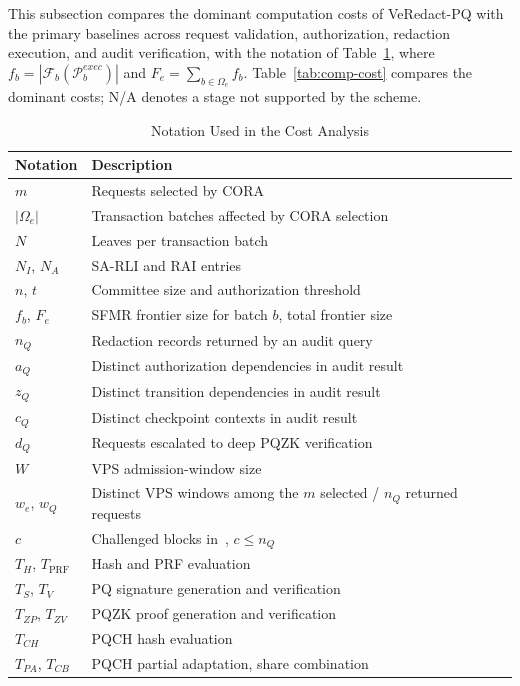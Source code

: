 \documentclass[lettersize,journal]{IEEEtran}
\begin{document}
This subsection compares the dominant computation costs of VeRedact-PQ
with the primary baselines across request validation, authorization,
redaction execution, and audit verification, with the notation of
Table~\ref{tab:cost-notation}, where
$f_b=|\mathcal{F}_b(\mathcal{P}_b^{exec})|$ and
$F_e=\sum_{b\in\Omega_e}f_b$. Table~\ref{tab:comp-cost} compares the
dominant costs; N/A denotes a stage not supported by the scheme.

\begin{table}[t]
\centering
\caption{Notation Used in the Cost Analysis}
\label{tab:cost-notation}
\scriptsize
\renewcommand{\arraystretch}{1.08}
\setlength{\tabcolsep}{3pt}
\begin{tabular}{ll}
\hline
\textbf{Notation} & \textbf{Description} \\
\hline
$m$ & Requests selected by CORA \\
$|\Omega_e|$ & Transaction batches affected by CORA selection \\
$N$ & Leaves per transaction batch \\
$N_I$, $N_A$ & SA-RLI and RAI entries \\
$n$, $t$ & Committee size and authorization threshold \\
$f_b$, $F_e$ & SFMR frontier size for batch $b$, total frontier size \\
$n_Q$ & Redaction records returned by an audit query \\
$a_Q$ & Distinct authorization dependencies in audit result \\
$z_Q$ & Distinct transition dependencies in audit result \\
$c_Q$ & Distinct checkpoint contexts in audit result \\
$d_Q$ & Requests escalated to deep PQZK verification \\
$W$ & VPS admission-window size \\
$w_e$, $w_Q$ & Distinct VPS windows among the $m$ selected / $n_Q$ returned requests \\
$c$ & Challenged blocks in~\cite{ref13}, $c\le n_Q$ \\
\hline
$T_H$, $T_{\mathrm{PRF}}$ & Hash and PRF evaluation \\
$T_S$, $T_V$ & PQ signature generation and verification \\
$T_{ZP}$, $T_{ZV}$ & PQZK proof generation and verification \\
$T_{CH}$ & PQCH hash evaluation \\
$T_{PA}$, $T_{CB}$ & PQCH partial adaptation, share combination \\

\end{tabular}
\end{table}
\end{document}

